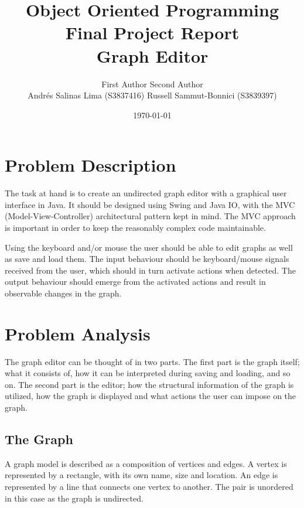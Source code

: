 \documentclass[a4paper]{article}
\begin{document}
\title{Object Oriented Programming\\
Final Project Report \\
Graph Editor
}

\date{\today}

\author{First Author \quad Second Author\\
Andr\'es Salinas Lima (S3837416) \quad Russell Sammut-Bonnici (S3839397)
}

\maketitle



\section{Problem Description}
\par The task at hand is to create an undirected graph editor with a graphical user interface in Java. It should be designed using Swing and Java IO, with the MVC (Model-View-Controller) architectural pattern kept in mind. The MVC approach is important in order to keep the reasonably complex code maintainable. 
\par Using the keyboard and/or mouse the user should be able to edit graphs as well as save and load them. The input behaviour should be keyboard/mouse signals received from the user, which should in turn activate actions when detected. The output behaviour should emerge from the activated actions and result in observable changes in the graph.



\section{Problem Analysis}
\par The graph editor can be thought of in two parts. The first part is the graph itself; what it consists of, how it can be interpreted during saving and loading, and so on. The second part is the editor; how the structural information of the graph is utilized, how the graph is displayed and what actions the user can impose on the graph.

\subsection{The Graph} \label{par: The Graph}
\par A graph model is described as a composition of vertices and edges. A vertex is represented by a rectangle, with its own name, size and location. An edge is represented by a line that connects one vertex to another. The pair is unordered in this case as the graph is undirected.
\end{document}
